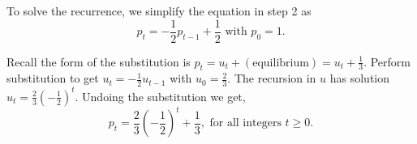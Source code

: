 \documentclass[../book.tex]{subfiles}
\begin{document}
\begin{solution}
To solve the recurrence, we simplify the equation in step 2 as
\begin{equation}\label{eq:models-14}
p_{t} = -\frac{1}{2} p_{t-1} + \frac{1}{2} \text{ with } p_{0} = 1.
\end{equation}

Recall the form of the substitution is \(p_{t} = u_{t} + (\text{equilibrium}) = u_{t} + \frac{1}{3}\).  Perform substitution to get \(u_{t} = -\frac{1}{2} u_{t-1}\) with \(u_{0} = \frac{2}{3}\).  The recursion in \(u\) has solution \(u_{t} = \frac{2}{3} \left( - \frac{1}{2} \right)^{t}\). Undoing the substitution we get,
\begin{equation}\label{eq:models-15}
p_{t} = \frac{2}{3} \left( - \frac{1}{2} \right)^{t} + \frac{1}{3}, \text{ for all integers } t \ge 0.
\end{equation}
\end{solution}
\end{document}
